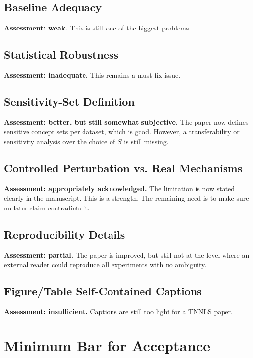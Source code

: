 \subsection*{Baseline Adequacy}
\textbf{Assessment: weak.}  
This is still one of the biggest problems.

\subsection*{Statistical Robustness}
\textbf{Assessment: inadequate.}  
This remains a must-fix issue.

\subsection*{Sensitivity-Set Definition}
\textbf{Assessment: better, but still somewhat subjective.}  
The paper now defines sensitive concept sets per dataset, which is good. However, a transferability or sensitivity analysis over the choice of $S$ is still missing.

\subsection*{Controlled Perturbation vs. Real Mechanisms}
\textbf{Assessment: appropriately acknowledged.}  
The limitation is now stated clearly in the manuscript. This is a strength. The remaining need is to make sure no later claim contradicts it.

\subsection*{Reproducibility Details}
\textbf{Assessment: partial.}  
The paper is improved, but still not at the level where an external reader could reproduce all experiments with no ambiguity.

\subsection*{Figure/Table Self-Contained Captions}
\textbf{Assessment: insufficient.}  
Captions are still too light for a TNNLS paper.

\section*{Minimum Bar for Acceptance}

